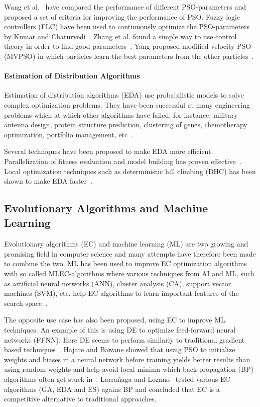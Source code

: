Wang et al.~\cite{dang2012selection} have compared the performance of different PSO-parameters and proposed a set of criteria for improving the performance of PSO. Fuzzy logic controllers (FLC) have been used to continuously optimize the PSO-parameters by Kumar and Chaturvedi~\cite{kumar2011tuning}. Zhang et al. found a simple way to use control theory in order to find good parameters~\cite{zhang2011simple}. Yang proposed modified velocity PSO (MVPSO) in which particles learn the best parameters from the other particles~\cite{yang2011particle}.


\paragraph{Estimation of Distribution Algorithms}

Estimation of distribution algorithms (EDA) use probabilistic models to solve complex optimization problems. They have been successful at many engineering problems which at which other algorithms have failed, for instance: military antenna design, protein structure prediction, clustering of genes, chemotherapy optimization, portfolio management, etc~\cite{Hauschild2011111}.

Several techniques have been proposed to make EDA more efficient. Parallelization of fitness evaluation and model building has proven effective~\cite{sastry2007towards}. Local optimization techniques such as deterministic hill climbing (DHC) has been shown to make EDA faster~\cite{hart1994adaptive}.

\subsection{Evolutionary Algorithms and Machine Learning}

Evolutionary algorithms (EC) and machine learning (ML) are two growing and promising field in computer science and many attempts have therefore been made to combine the two. ML has been used to improve EC optimization algorithms with so called MLEC-algorithms where various techniques from AI and ML, such as artificial neural networks (ANN), cluster analysis (CA), support vector machines (SVM), etc. help EC algorithms to learn important features of the search space~\cite{6052374}.

The opposite use case has also been proposed, using EC to improve ML techniques. An example of this is using DE to optimize feed-forward neural networks (FFNN). Here DE seems to perform similarly to traditional gradient based techniques~\cite{ilonen2003differential}. Hajare and Bawane showed that using PSO to initialize weights and biases in a neural network before training yields better results than using random weights and help avoid local minima which back-propagation (BP) algorithms often get stuck in~\cite{hajare2015feed}. Larra{\~n}aga and Lozano~\cite{larranaga2001estimation} tested various EC algorithms (GA, EDA and ES) agains BP and concluded that EC is a competitive alternative to traditional approaches.

